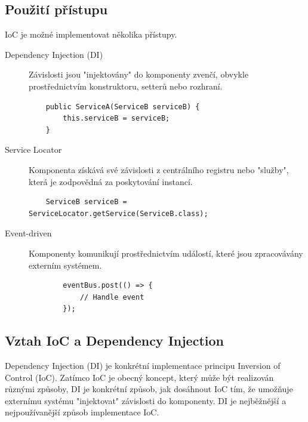 \subsection{Použití přístupu}
IoC je možné implementovat několika přístupy.
\begin{description}
    \item[Dependency Injection (DI)] Závislosti jsou "injektovány" do komponenty zvenčí, obvykle prostřednictvím konstruktoru, setterů nebo rozhraní.
    \begin{verbatim}
    public ServiceA(ServiceB serviceB) {
        this.serviceB = serviceB;
    }
    \end{verbatim}
    \item[Service Locator] Komponenta získává své závislosti z centrálního registru nebo "služby", která je zodpovědná za poskytování instancí.
    \begin{verbatim}
    ServiceB serviceB = ServiceLocator.getService(ServiceB.class);
    \end{verbatim}
    \item[Event-driven] Komponenty komunikují prostřednictvím událostí, které jsou zpracovávány externím systémem.
    \begin{verbatim}
        eventBus.post(() => {
            // Handle event
        });
    \end{verbatim}
\end{description}


\subsection{Vztah IoC a Dependency Injection}
Dependency Injection (DI) je konkrétní implementace principu Inversion of Control (IoC).
Zatímco IoC je obecný koncept, který může být realizován různými způsoby, 
DI je konkrétní způsob, jak dosáhnout IoC tím, že umožňuje externímu systému 
"injektovat" závislosti do komponenty.
DI je nejběžnější a nejpoužívanější způsob implementace IoC.

